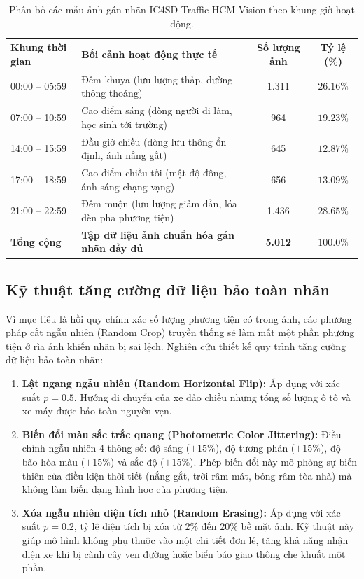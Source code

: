 \begin{table}[htbp]
\centering
\caption{Phân bố các mẫu ảnh gán nhãn IC4SD-Traffic-HCM-Vision theo khung giờ hoạt động.}
\label{tab:thong_ke_vision_chapter3}
\small
\begin{tabularx}{\textwidth}{l X c c}
\toprule
\textbf{Khung thời gian} & \textbf{Bối cảnh hoạt động thực tế} & \textbf{Số lượng ảnh} & \textbf{Tỷ lệ (\%)} \\
\midrule
00:00 -- 05:59 & Đêm khuya (lưu lượng thấp, đường thông thoáng) & 1.311 & $26.16\%$ \\
07:00 -- 10:59 & Cao điểm sáng (dòng người đi làm, học sinh tới trường) & 964 & $19.23\%$ \\
14:00 -- 15:59 & Đầu giờ chiều (dòng lưu thông ổn định, ánh nắng gắt) & 645 & $12.87\%$ \\
17:00 -- 18:59 & Cao điểm chiều tối (mật độ đông, ánh sáng chạng vạng) & 656 & $13.09\%$ \\
21:00 -- 22:59 & Đêm muộn (lưu lượng giảm dần, lóa đèn pha phương tiện) & 1.436 & $28.65\%$ \\
\midrule
\textbf{Tổng cộng} & \textbf{Tập dữ liệu ảnh chuẩn hóa gán nhãn đầy đủ} & \textbf{5.012} & $\mathbf{100.0\%}$ \\
\bottomrule
\end{tabularx}
\end{table}

\subsection{Kỹ thuật tăng cường dữ liệu bảo toàn nhãn}
Vì mục tiêu là hồi quy chính xác số lượng phương tiện có trong ảnh, các phương pháp cắt ngẫu nhiên (Random Crop) truyền thống sẽ làm mất một phần phương tiện ở rìa ảnh khiến nhãn bị sai lệch. Nghiên cứu thiết kế quy trình tăng cường dữ liệu bảo toàn nhãn:
\begin{enumerate}
    \item \textbf{Lật ngang ngẫu nhiên (Random Horizontal Flip):} Áp dụng với xác suất $p = 0.5$. Hướng di chuyển của xe đảo chiều nhưng tổng số lượng ô tô và xe máy được bảo toàn nguyên vẹn.
    \item \textbf{Biến đổi màu sắc trắc quang (Photometric Color Jittering):} Điều chỉnh ngẫu nhiên 4 thông số: độ sáng ($\pm 15\%$), độ tương phản ($\pm 15\%$), độ bão hòa màu ($\pm 15\%$) và sắc độ ($\pm 15\%$). Phép biến đổi này mô phỏng sự biến thiên của điều kiện thời tiết (nắng gắt, trời râm mát, bóng râm tòa nhà) mà không làm biến dạng hình học của phương tiện.
    \item \textbf{Xóa ngẫu nhiên diện tích nhỏ (Random Erasing):} Áp dụng với xác suất $p = 0.2$, tỷ lệ diện tích bị xóa từ $2\%$ đến $20\%$ bề mặt ảnh. Kỹ thuật này giúp mô hình không phụ thuộc vào một chi tiết đơn lẻ, tăng khả năng nhận diện xe khi bị cành cây ven đường hoặc biển báo giao thông che khuất một phần.
\end{enumerate}

